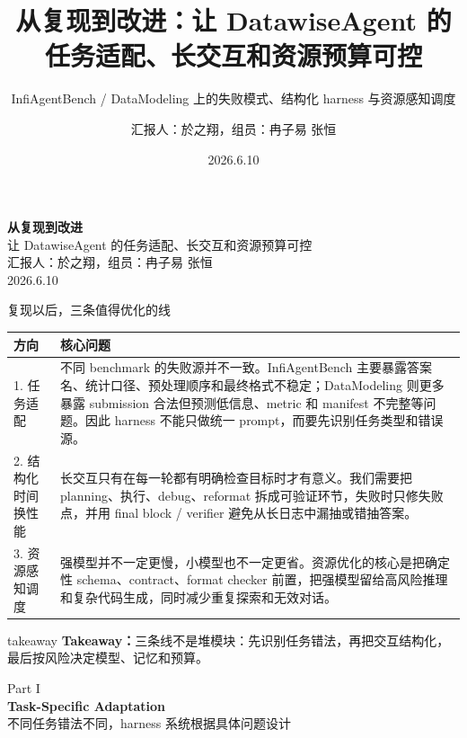 \documentclass[aspectratio=169,UTF8]{ctexbeamer}
\title{从复现到改进：让 DatawiseAgent 的任务适配、长交互和资源预算可控}
\subtitle{InfiAgentBench / DataModeling 上的失败模式、结构化 harness 与资源感知调度}
\author{汇报人：於之翔，组员：冉子易 张恒}
\date{2026.6.10}
\newcommand{\chip}[1]{\begingroup\setlength{\fboxsep}{2pt}\colorbox{DWBlue!10}{\scriptsize\textcolor{DWBlue}{#1}}\endgroup}
\newcommand{\takeaway}[1]{%
  \vspace{0.35em}
  \begin{beamercolorbox}[wd=\textwidth,sep=0.75ex,rounded=true]{takeaway}
    \textbf{Takeaway：}#1
  \end{beamercolorbox}
}
\newcommand{\parttitle}[3]{%
  \begin{frame}[plain]
    \vspace{1.4em}
    \begin{center}
      \chip{#1}\\[1.0em]
      {\Huge\textbf{#2}}\\[0.7em]
      {\large #3}
    \end{center}
  \end{frame}
}
\begin{document}
\begin{frame}
  \vspace{1.0em}
  \begin{center}
    {\Huge\textbf{从复现到改进}}\\[0.5em]
    {\Large 让 DatawiseAgent 的任务适配、长交互和资源预算可控}\\[4.2em]
    汇报人：於之翔，组员：冉子易 张恒\\[0.45em]
    2026.6.10
  \end{center}
\end{frame}

\begin{frame}{复现以后，三条值得优化的线}
\footnotesize
\begin{tabularx}{\textwidth}{p{} X}
\toprule
方向 & 核心问题 \\
\midrule
1. 任务适配 &
不同 benchmark 的失败源并不一致。InfiAgentBench 主要暴露答案名、统计口径、预处理顺序和最终格式不稳定；DataModeling 则更多暴露 submission 合法但预测低信息、metric 和 manifest 不完整等问题。因此 harness 不能只做统一 prompt，而要先识别任务类型和错误源。 \\
\midrule
2. 结构化时间换性能 &
长交互只有在每一轮都有明确检查目标时才有意义。我们需要把 planning、执行、debug、reformat 拆成可验证环节，失败时只修失败点，并用 final block / verifier 避免从长日志中漏抽或错抽答案。 \\
\midrule
3. 资源感知调度 &
强模型并不一定更慢，小模型也不一定更省。资源优化的核心是把确定性 schema、contract、format checker 前置，把强模型留给高风险推理和复杂代码生成，同时减少重复探索和无效对话。 \\
\bottomrule
\end{tabularx}
\takeaway{三条线不是堆模块：先识别任务错法，再把交互结构化，最后按风险决定模型、记忆和预算。}
\end{frame}

\parttitle{Part I}{Task-Specific Adaptation}{不同任务错法不同，harness 系统根据具体问题设计}
\end{document}
